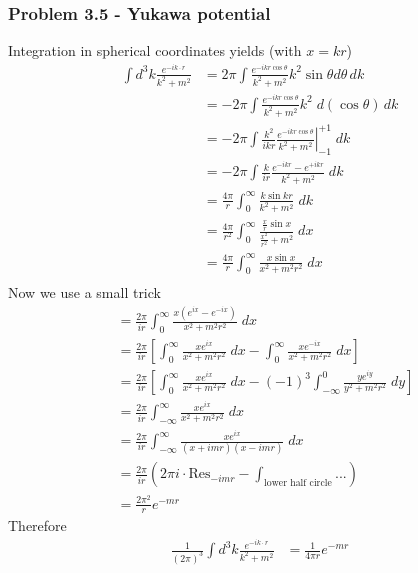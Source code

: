 \documentclass[10pt,a4paper]{article}
\theoremstyle{definition}
\begin{document}
\subsubsection{Problem 3.5 - Yukawa potential}
Integration in spherical coordinates yields (with $x=kr$)
\begin{align}
    \int d^3k\frac{e^{-ik\cdot r}}{k^2+m^2}
    &=2\pi\int  \frac{e^{-ikr\cos{\theta}}}{k^2+m^2} k^2\sin\theta d\theta\, dk\\
    &=-2\pi\int \frac{e^{-ikr\cos{\theta}}}{k^2+m^2} k^2 \; d(\cos\theta)\, dk\\
    &=-2\pi\int \left.\frac{k^2}{ikr}\frac{e^{-ikr\cos{\theta}}}{k^2+m^2} \right|_{-1}^{+1} \; dk\\
    &=-2\pi\int \frac{k}{ir}\frac{e^{-ikr}-e^{+ikr}}{k^2+m^2}  \; dk\\
    &=\frac{4\pi}{r}\int_0^\infty  \frac{k\sin{kr}}{k^2+m^2}  \; dk\\
    &=\frac{4\pi}{r^2}\int_0^\infty  \frac{\frac{x}{r}\sin{x}}{\frac{x^2}{r^2}+m^2}  \; dx\\
    &=\frac{4\pi}{r}\int_0^\infty  \frac{x\sin{x}}{x^2+m^2r^2}  \; dx\\
\end{align}
Now we use a small trick
\begin{align}
    &=\frac{2\pi}{ir}\int_0^\infty  \frac{x(e^{ix}-e^{-ix})}{x^2+m^2r^2}  \; dx\\
    &=\frac{2\pi}{ir}\left[\int_0^\infty\frac{xe^{ix}}{x^2+m^2r^2}  \; dx - \int_0^\infty\frac{xe^{-ix}}{x^2+m^2r^2}  \; dx\right]\\
    &=\frac{2\pi}{ir}\left[\int_0^\infty\frac{xe^{ix}}{x^2+m^2r^2}  \; dx - (-1)^3 \int_{-\infty}^0\frac{ye^{iy}}{y^2+m^2r^2}  \; dy\right]\\
    &=\frac{2\pi}{ir}\int_{-\infty}^\infty\frac{xe^{ix}}{x^2+m^2r^2}  \; dx \\
    &=\frac{2\pi}{ir}\int_{-\infty}^\infty\frac{xe^{ix}}{(x+imr)(x-imr)}  \; dx \\
    &= \frac{2\pi}{ir}\left(2\pi i\cdot \text{Res}_{-imr}-\int_\text{lower half circle}...\right)\\
    &= \frac{2\pi^2}{r} e^{-mr}
\end{align}
Therefore
\begin{align}
    \frac{1}{(2\pi)^3}\int d^3k\frac{e^{-ik\cdot r}}{k^2+m^2}
    &= \frac{1}{4\pi r} e^{-mr}
\end{align}
\end{document}
